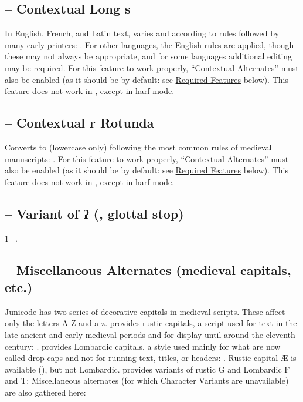\subsection{ – Contextual Long s}
In English, French, and Latin text, varies  and  according to rules
followed by many early printers: . For other languages, the English rules are applied, though these may not always be
appropriate, and for some languages additional editing may be required. For this
feature to work properly,  “Contextual Alternates” must also be enabled (as it should be by
default: see \hyperlink{req}{Required Features} below). This feature does not work in {\ltech}, except in harf mode.

\subsection{ –
Contextual r Rotunda}\hypertarget{ss16}{}
Converts  to  (lowercase only) following the
most common rules of medieval manuscripts:
.
For this feature to work properly,
 “Contextual Alternates” must also be enabled (as it should be by default: see
\hyperlink{req}{Required Features} below).  This feature does not work in {\ltech}, except in harf mode.

\subsection{ – Variant of ʔ (, glottal stop)}
1=.

\subsection{ –
Miscellaneous Alternates (medieval capitals, etc.)}\hypertarget{salt}{}
Junicode has two series of decorative capitals in medieval scripts. These affect only the letters
A-Z and a-z.  provides rustic capitals, a script used for text in the late
ancient and early medieval periods and for display until around the eleventh century:
. 
provides Lombardic capitals, a style used mainly for what are now called drop caps and not for
running text, titles, or headers:
.
Rustic capital Æ is available (), but not Lombardic.
 provides variants of rustic G and Lombardic F and T:
Miscellaneous alternates (for which Character Variants are
unavailable) are also gathered here:

